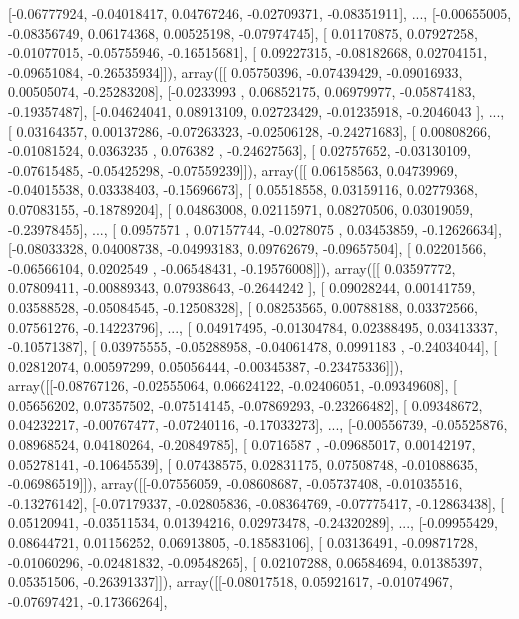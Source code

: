 \documentclass{article}
\begin{document}
       [-0.06777924, -0.04018417,  0.04767246, -0.02709371, -0.08351911],
       ..., 
       [-0.00655005, -0.08356749,  0.06174368,  0.00525198, -0.07974745],
       [ 0.01170875,  0.07927258, -0.01077015, -0.05755946, -0.16515681],
       [ 0.09227315, -0.08182668,  0.02704151, -0.09651084, -0.26535934]]), array([[ 0.05750396, -0.07439429, -0.09016933,  0.00505074, -0.25283208],
       [-0.0233993 ,  0.06852175,  0.06979977, -0.05874183, -0.19357487],
       [-0.04624041,  0.08913109,  0.02723429, -0.01235918, -0.2046043 ],
       ..., 
       [ 0.03164357,  0.00137286, -0.07263323, -0.02506128, -0.24271683],
       [ 0.00808266, -0.01081524,  0.0363235 ,  0.076382  , -0.24627563],
       [ 0.02757652, -0.03130109, -0.07615485, -0.05425298, -0.07559239]]), array([[ 0.06158563,  0.04739969, -0.04015538,  0.03338403, -0.15696673],
       [ 0.05518558,  0.03159116,  0.02779368,  0.07083155, -0.18789204],
       [ 0.04863008,  0.02115971,  0.08270506,  0.03019059, -0.23978455],
       ..., 
       [ 0.0957571 ,  0.07157744, -0.0278075 ,  0.03453859, -0.12626634],
       [-0.08033328,  0.04008738, -0.04993183,  0.09762679, -0.09657504],
       [ 0.02201566, -0.06566104,  0.0202549 , -0.06548431, -0.19576008]]), array([[ 0.03597772,  0.07809411, -0.00889343,  0.07938643, -0.2644242 ],
       [ 0.09028244,  0.00141759,  0.03588528, -0.05084545, -0.12508328],
       [ 0.08253565,  0.00788188,  0.03372566,  0.07561276, -0.14223796],
       ..., 
       [ 0.04917495, -0.01304784,  0.02388495,  0.03413337, -0.10571387],
       [ 0.03975555, -0.05288958, -0.04061478,  0.0991183 , -0.24034044],
       [ 0.02812074,  0.00597299,  0.05056444, -0.00345387, -0.23475336]]), array([[-0.08767126, -0.02555064,  0.06624122, -0.02406051, -0.09349608],
       [ 0.05656202,  0.07357502, -0.07514145, -0.07869293, -0.23266482],
       [ 0.09348672,  0.04232217, -0.00767477, -0.07240116, -0.17033273],
       ..., 
       [-0.00556739, -0.05525876,  0.08968524,  0.04180264, -0.20849785],
       [ 0.0716587 , -0.09685017,  0.00142197,  0.05278141, -0.10645539],
       [ 0.07438575,  0.02831175,  0.07508748, -0.01088635, -0.06986519]]), array([[-0.07556059, -0.08608687, -0.05737408, -0.01035516, -0.13276142],
       [-0.07179337, -0.02805836, -0.08364769, -0.07775417, -0.12863438],
       [ 0.05120941, -0.03511534,  0.01394216,  0.02973478, -0.24320289],
       ..., 
       [-0.09955429,  0.08644721,  0.01156252,  0.06913805, -0.18583106],
       [ 0.03136491, -0.09871728, -0.01060296, -0.02481832, -0.09548265],
       [ 0.02107288,  0.06584694,  0.01385397,  0.05351506, -0.26391337]]), array([[-0.08017518,  0.05921617, -0.01074967, -0.07697421, -0.17366264],
\end{document}
